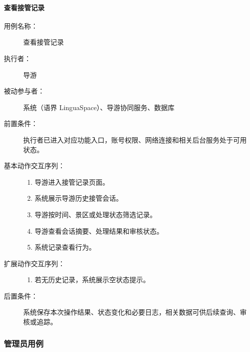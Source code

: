 \paragraph{查看接管记录}
\begin{description}
  \item[用例名称：] 查看接管记录
  \item[执行者：] 导游
  \item[被动参与者：] 系统（语界 LinguaSpace）、导游协同服务、数据库
  \item[前置条件：] 执行者已进入对应功能入口，账号权限、网络连接和相关后台服务处于可用状态。
  \item[基本动作交互序列：]
  \begin{enumerate}
    \item 导游进入接管记录页面。
    \item 系统展示导游历史接管会话。
    \item 导游按时间、景区或处理状态筛选记录。
    \item 导游查看会话摘要、处理结果和审核状态。
    \item 系统记录查看行为。
  \end{enumerate}
  \item[扩展动作交互序列：]
  \begin{enumerate}
    \item[2a.] 若无历史记录，系统展示空状态提示。
  \end{enumerate}
  \item[后置条件：] 系统保存本次操作结果、状态变化和必要日志，相关数据可供后续查询、审核或追踪。
\end{description}

\subsubsection{管理员用例}



